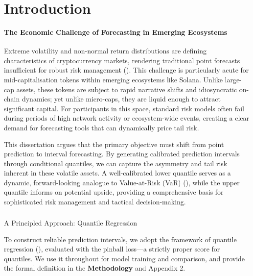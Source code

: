 \documentclass[
  a4paper,
  DIV=11,
  numbers=noendperiod]{scrreprt}
\makeatletter
\let\oldparagraph\paragraph
\renewcommand{\paragraph}{
    \@ifstar
      \xxxParagraphStar
      \xxxParagraphNoStar
  }
\newcommand{\xxxParagraphStar}[1]{\oldparagraph*{#1}\mbox{}}
\newcommand{\xxxParagraphNoStar}[1]{\oldparagraph{#1}\mbox{}}
\makeatother
\begin{document}

\chapter{Introduction}\label{introduction}

\subsubsection{The Economic Challenge of Forecasting in Emerging
Ecosystems}\label{the-economic-challenge-of-forecasting-in-emerging-ecosystems}

Extreme volatility and non-normal return distributions are defining
characteristics of cryptocurrency markets, rendering traditional point
forecasts insufficient for robust risk management
(). This
challenge is particularly acute for mid-capitalisation tokens within
emerging ecosystems like Solana. Unlike large-cap assets, these tokens
are subject to rapid narrative shifts and idiosyncratic on-chain
dynamics; yet unlike micro-caps, they are liquid enough to attract
significant capital. For participants in this space, standard risk
models often fail during periods of high network activity or
ecosystem-wide events, creating a clear demand for forecasting tools
that can dynamically price tail risk.

This dissertation argues that the primary objective must shift from
point prediction to interval forecasting. By generating calibrated
prediction intervals through conditional quantiles, we can capture the
asymmetry and tail risk inherent in these volatile assets. A
well-calibrated lower quantile serves as a dynamic, forward-looking
analogue to Value-at-Risk (VaR) (), while the upper quantile informs on potential
upside, providing a comprehensive basis for sophisticated risk
management and tactical decision-making.

\paragraph{A Principled Approach: Quantile
Regression}\label{a-principled-approach-quantile-regression}

To construct reliable prediction intervals, we adopt the framework of
quantile regression (), evaluated with the pinball loss---a strictly proper score for
quantiles. We use it throughout for model training and comparison, and
provide the formal definition in the \textbf{Methodology} and Appendix
2.
\end{document}
